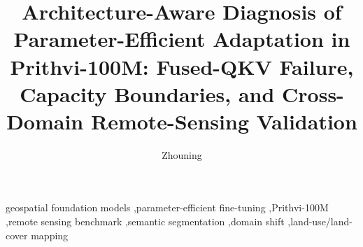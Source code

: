 \documentclass[preprint,12pt,authoryear]{elsarticle}
\begin{document}
\begin{frontmatter}

\title{Architecture-Aware Diagnosis of Parameter-Efficient Adaptation in Prithvi-100M: Fused-QKV Failure, Capacity Boundaries, and Cross-Domain Remote-Sensing Validation}

\author[alphaearth]{Zhouning}



\begin{keyword}
geospatial foundation models \sep parameter-efficient fine-tuning \sep Prithvi-100M \sep remote sensing benchmark \sep semantic segmentation \sep domain shift \sep land-use/land-cover mapping
\end{keyword}

\end{frontmatter}














\end{document}
